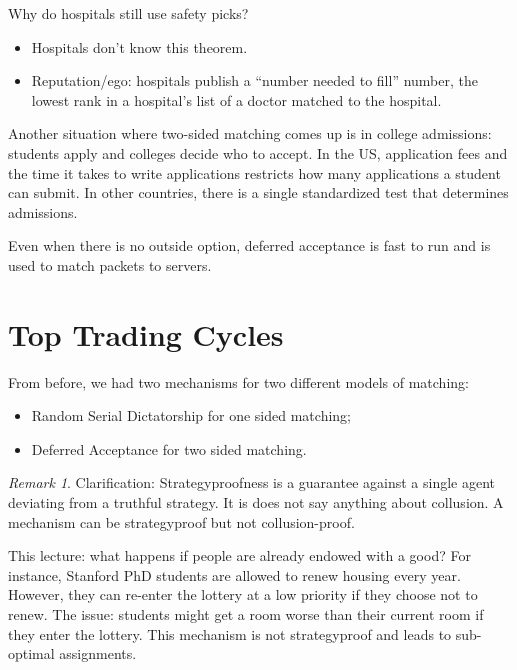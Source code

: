\documentclass[dvipsnames]{article}
\theoremstyle{definition}
\theoremstyle{remark}
\newtheorem*{remark}{Remark}
\begin{document}
Why do hospitals still use safety picks?
\begin{itemize}
	\item Hospitals don't know this theorem.
	\item Reputation/ego: hospitals publish a ``number needed to fill'' number, the lowest rank in a hospital's list of a doctor matched to the hospital.
\end{itemize}

Another situation where two-sided matching comes up is in college admissions: students apply and colleges decide who to accept. 
In the US, application fees and the time it takes to write applications restricts how many applications a student can submit.
In other countries, there is a single standardized test that determines admissions.

Even when there is no outside option, deferred acceptance is fast to run and is used to match packets to servers.	

\newpage

\section{Top Trading Cycles}
From before, we had two mechanisms for two different models of matching:
\begin{itemize}
	\item Random Serial Dictatorship for one sided matching;
	\item Deferred Acceptance for two sided matching.
\end{itemize}

\begin{remark}
	Clarification: Strategyproofness is a guarantee against a single agent deviating from a truthful strategy.
	It is does not say anything about collusion. A mechanism can be strategyproof but not collusion-proof.
\end{remark}

This lecture: what happens if people are already endowed with a good? For instance, Stanford PhD students are allowed to renew housing every year. However, they can re-enter the lottery at a low priority if they choose not to renew. The issue: students might get a room worse than their current room if they enter the lottery. This mechanism is not strategyproof and leads to sub-optimal assignments. 
\end{document}
